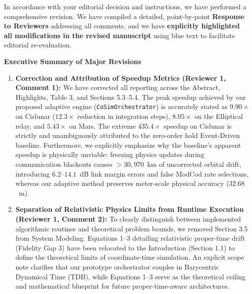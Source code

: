 \documentclass[10pt]{article}
\begin{document}
In accordance with your editorial decision and instructions, we have performed a comprehensive revision. We have compiled a detailed, point-by-point \textbf{Response to Reviewers} addressing all comments, and we have \textbf{explicitly highlighted all modifications in the revised manuscript} using blue text to facilitate editorial re-evaluation.

\vspace{0.08cm}
\noindent
\textbf{\large Executive Summary of Major Revisions}
\vspace{0.05cm}

\begin{enumerate}[leftmargin=1.8em, itemsep=2.5pt, topsep=1pt, parsep=0pt]
  \item \textbf{Correction and Attribution of Speedup Metrics (Reviewer 1, Comment 1):}
  We have corrected all reporting across the Abstract, Highlights, Table 3, and Sections 5.3--5.4. The peak speedup achieved by our proposed adaptive engine (\texttt{CoSimOrchestrator}) is accurately stated as \textbf{$9.90\times$} on Cislunar ($12.3\times$ reduction in integration steps), \textbf{$8.05\times$} on the Elliptical relay, and \textbf{$5.43\times$} on Mars. The extreme $435.4\times$ speedup on Cislunar is strictly and unambiguously attributed to the zero-order hold Event-Driven baseline. Furthermore, we explicitly emphasize why the baseline's apparent speedup is physically unviable: freezing physics updates during communication blackouts causes $>30,970$~km of uncorrected orbital drift, introducing $6.2$--$14.1$~dB link margin errors and false ModCod rate selections, whereas our adaptive method preserves meter-scale physical accuracy ($32.68$~m).

  \item \textbf{Separation of Relativistic Physics Limits from Runtime Execution (Reviewer 1, Comment 2):}
  To clearly distinguish between implemented algorithmic routines and theoretical problem bounds, we removed Section 3.5 from System Modeling. Equations 1--3 detailing relativistic proper-time drift (Fidelity Gap 3) have been relocated to the Introduction (Section 1.1) to define the theoretical limits of coordinate-time simulation. An explicit scope note clarifies that our prototype orchestrator couples in Barycentric Dynamical Time (TDB), while Equations 1--3 serve as the theoretical ceiling and mathematical blueprint for future proper-time-aware architectures.


\end{enumerate}
\end{document}
